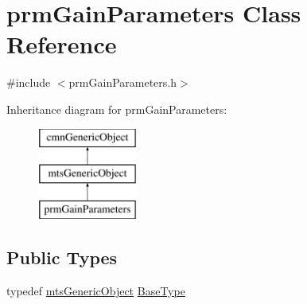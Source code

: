 \hypertarget{classprm_gain_parameters}{}\section{prm\+Gain\+Parameters Class Reference}
\label{classprm_gain_parameters}


{\ttfamily \#include $<$prm\+Gain\+Parameters.\+h$>$}

Inheritance diagram for prm\+Gain\+Parameters\+:\begin{figure}[H]
\begin{center}
\leavevmode
\includegraphics[height=3.000000cm]{de/d09/classprm_gain_parameters}
\end{center}
\end{figure}
\subsection*{Public Types}
\begin{DoxyCompactItemize}
\item 
typedef \hyperlink{classmts_generic_object}{mts\+Generic\+Object} \hyperlink{classprm_gain_parameters_ac13e32cd34eafe7bd371cf0fe7735838}{Base\+Type}
\end{DoxyCompactItemize}
